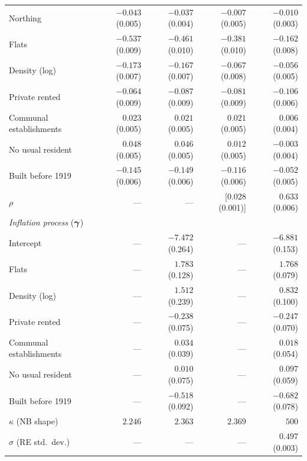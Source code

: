 \begin{table}[htbp]
\begin{tabular}{lrrrr}
Northing                           & $-0.043$ (0.005) & $-0.037$ (0.004) & $-0.007$ (0.005) & $-0.010$ (0.003) \\
Flats                              & $-0.537$ (0.009) & $-0.461$ (0.010) & $-0.381$ (0.010) & $-0.162$ (0.008) \\
Density (log)                      & $-0.173$ (0.007) & $-0.167$ (0.007) & $-0.067$ (0.008) & $-0.056$ (0.005) \\
Private rented                     & $-0.064$ (0.009) & $-0.087$ (0.009) & $-0.081$ (0.009) & $-0.106$ (0.006) \\
Communal establishments            & $0.023$ (0.005) & $0.021$ (0.005) & $0.021$ (0.005) & $0.006$ (0.004) \\
No usual resident                  & $0.048$ (0.005) & $0.046$ (0.005) & $0.012$ (0.005) & $-0.003$ (0.004) \\
Built before 1919                  & $-0.145$ (0.006) & $-0.149$ (0.006) & $-0.116$ (0.006) & $-0.052$ (0.005) \\
$\rho$                             & --- & --- & [$0.028$ (0.001)] & $0.633$ (0.006) \\
\midrule
\multicolumn{5}{l}{\textit{Inflation process} ($\boldsymbol{\gamma}$)} \\
Intercept                          & --- & $-7.472$ (0.264) & --- & $-6.881$ (0.153) \\
Flats                              & --- & $1.783$ (0.128) & --- & $1.768$ (0.079) \\
Density (log)                      & --- & $1.512$ (0.239) & --- & $0.832$ (0.100) \\
Private rented                     & --- & $-0.238$ (0.075) & --- & $-0.247$ (0.070) \\
Communal establishments            & --- & $0.034$ (0.039) & --- & $0.018$ (0.054) \\
No usual resident                  & --- & $0.010$ (0.075) & --- & $0.097$ (0.059) \\
Built before 1919                  & --- & $-0.518$ (0.092) & --- & $-0.682$ (0.078) \\
\midrule
$\kappa$ (NB shape)                & $2.246$ & $2.363$ & $2.369$ & $500$ \\
$\sigma$ (RE std.\ dev.)           & --- & --- & --- & $0.497$ (0.003) \\
\bottomrule
\end{tabular}
\end{table}

